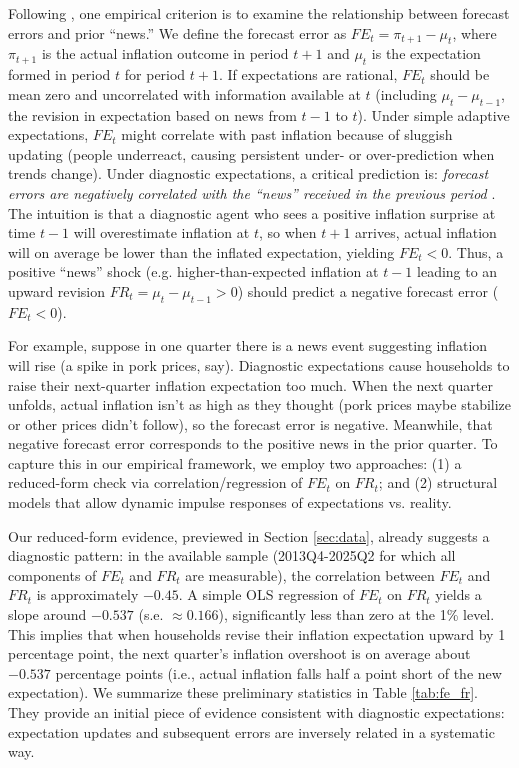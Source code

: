 \documentclass[12pt]{article}
\begin{document}
Following \cite{Bordalo2018}, one empirical criterion is to examine the relationship between forecast errors and prior “news.” We define the forecast error as $FE_t = \pi_{t+1} - \mu_t$, where $\pi_{t+1}$ is the actual inflation outcome in period $t+1$ and $\mu_t$ is the expectation formed in period $t$ for period $t+1$. If expectations are rational, $FE_t$ should be mean zero and uncorrelated with information available at $t$ (including $\mu_t - \mu_{t-1}$, the revision in expectation based on news from $t-1$ to $t$). Under simple adaptive expectations, $FE_t$ might correlate with past inflation because of sluggish updating (people underreact, causing persistent under- or over-prediction when trends change). Under diagnostic expectations, a critical prediction is: \textit{forecast errors are negatively correlated with the “news” received in the previous period} \cite{Bordalo2018}. The intuition is that a diagnostic agent who sees a positive inflation surprise at time $t-1$ will overestimate inflation at $t$, so when $t+1$ arrives, actual inflation will on average be lower than the inflated expectation, yielding $FE_t<0$. Thus, a positive “news” shock (e.g. higher-than-expected inflation at $t-1$ leading to an upward revision $FR_t = \mu_t - \mu_{t-1} > 0$) should predict a negative forecast error ($FE_t < 0$).

For example, suppose in one quarter there is a news event suggesting inflation will rise (a spike in pork prices, say). Diagnostic expectations cause households to raise their next-quarter inflation expectation too much. When the next quarter unfolds, actual inflation isn't as high as they thought (pork prices maybe stabilize or other prices didn't follow), so the forecast error is negative. Meanwhile, that negative forecast error corresponds to the positive news in the prior quarter. To capture this in our empirical framework, we employ two approaches: (1) a reduced-form check via correlation/regression of $FE_t$ on $FR_t$; and (2) structural models that allow dynamic impulse responses of expectations vs. reality.

Our reduced-form evidence, previewed in Section \ref{sec:data}, already suggests a diagnostic pattern: in the available sample (2013Q4-2025Q2 for which all components of $FE_t$ and $FR_t$ are measurable), the correlation between $FE_t$ and $FR_{t}$ is approximately $-0.45$. A simple OLS regression of $FE_t$ on $FR_t$ yields a slope around $-0.537$ (s.e. $\approx 0.166$), significantly less than zero at the 1\% level. This implies that when households revise their inflation expectation upward by 1 percentage point, the next quarter's inflation overshoot is on average about $-0.537$ percentage points (i.e., actual inflation falls half a point short of the new expectation). We summarize these preliminary statistics in Table \ref{tab:fe_fr}. They provide an initial piece of evidence consistent with diagnostic expectations: expectation updates and subsequent errors are inversely related in a systematic way.
\end{document}
